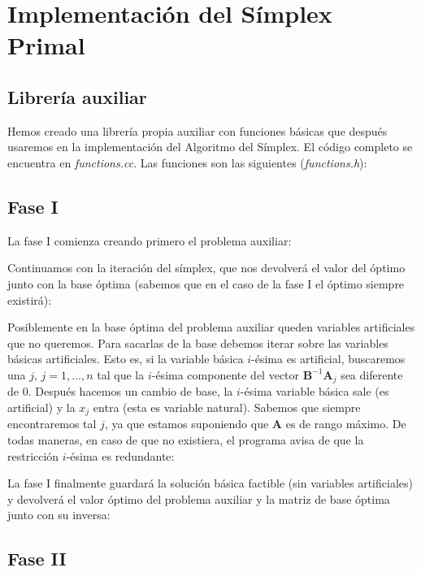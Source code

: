 \documentclass[11pt]{article}
\begin{document}
\section{Implementación del Símplex Primal}

\subsection{Librería auxiliar}
\noindent Hemos creado una librería propia auxiliar con funciones básicas que
después usaremos en la implementación del Algoritmo del Símplex. El código
completo se encuentra en \textit{functions.cc}. Las
funciones son las siguientes (\textit{functions.h}):

\subsection{Fase I}
\noindent La fase I comienza creando primero el problema auxiliar:

\noindent Continuamos con la iteración del símplex, que nos devolverá el valor
del óptimo junto con la base óptima (sabemos que en el caso de la fase I el
óptimo siempre existirá):

\noindent Posiblemente en la base óptima del problema auxiliar queden variables
artificiales que no queremos. Para sacarlas de la base debemos iterar sobre las
variables básicas artificiales. Esto es, si la variable básica $i$-ésima es
artificial, buscaremos una $j, \, j = 1,\ldots, n$ tal que la $i$-ésima componente
del vector $\mathbf{B}^{-1} \mathbf{A}_j$ sea diferente de 0. Después hacemos un cambio de base, la
$i$-ésima variable básica sale (es artificial) y la $x_j$ entra (esta es variable
natural). Sabemos que siempre encontraremos tal $j$, ya que estamos suponiendo
que $\mathbf{A}$ es de rango máximo. De todas maneras, en caso de que no existiera, el
programa avisa de que la restricción $i$-ésima es redundante:

\noindent La fase I finalmente guardará la solución básica factible (sin
variables artificiales) y devolverá el valor óptimo del problema auxiliar y
la matriz de base óptima junto con su inversa:

\subsection{Fase II}
\end{document}
